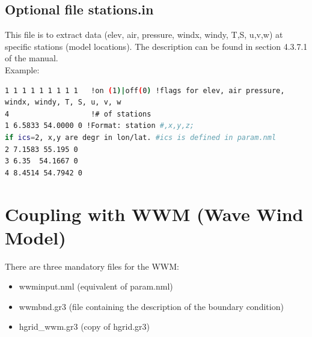 \documentclass[preprints,briefreport,accept,oneauthor,pdftex]{Definitions/mdpi}
\begin{document}
\subsection{Optional file stations.in}
This file is to  extract data (elev, air, pressure, windx, windy, T,S, u,v,w) at specific stations (model locations). The description can be found in section 4.3.7.1 of the manual.\\
Example:
\begin{lstlisting}[language=bash]
1 1 1 1 1 1 1 1 1   !on (1)|off(0) !flags for elev, air pressure, 
windx, windy, T, S, u, v, w
4                   !# of stations
1 6.5833 54.0000 0 !Format: station #,x,y,z; 
if ics=2, x,y are degr in lon/lat. #ics is defined in param.nml
2 7.1583 55.195 0 
3 6.35  54.1667 0 
4 8.4514 54.7942 0
\end{lstlisting}

\section{Coupling with WWM (Wave Wind Model)}
\noindent There are three mandatory files for the WWM: 
\begin{itemize}
    \item wwminput.nml (equivalent of param.nml)
    \item wwmbnd.gr3 (file containing the description of the boundary condition)
    \item hgrid\_wwm.gr3 (copy of hgrid.gr3)
\end{itemize}
\end{document}
